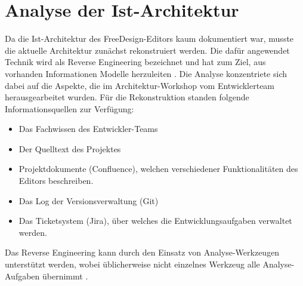 \section{Analyse der Ist-Architektur}
Da die Ist-Architektur des FreeDesign-Editors kaum dokumentiert war, musste die aktuelle Architektur zunächst rekonstruiert werden. 
Die dafür angewendet Technik wird als Reverse Engineering bezeichnet und hat zum Ziel, aus vorhanden Informationen Modelle herzuleiten \autocite[vgl.][590]{LudewigLichter2013}. 
Die Analyse konzentriete sich dabei auf die Aspekte, die im Architektur-Workshop vom Entwicklerteam herausgearbeitet wurden.
Für die Rekonstruktion standen folgende Informationsquellen zur Verfügung:
\begin{itemize}
	\item Das Fachwissen des Entwickler-Teams
	\item Der Quelltext des Projektes
	\item Projektdokumente (Confluence), welchen verschiedener Funktionalitäten des Editors beschreiben. 
	\item Das Log der Versionsverwaltung (Git)
	\item Das Ticketsystem (Jira), über welches die Entwicklungsaufgaben verwaltet werden. 
\end{itemize} 

Das Reverse Engineering kann durch den Einsatz von Analyse-Werkzeugen unterstützt werden, wobei üblicherweise nicht einzelnes Werkzeug alle Analyse-Aufgaben übernimmt \autocite[vgl.][381]{Bass2013}. 

